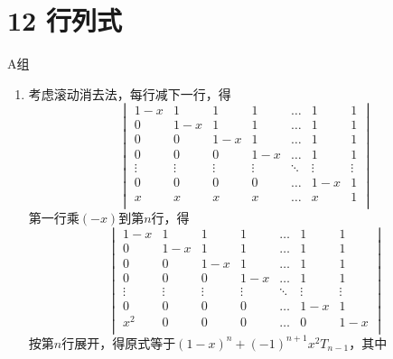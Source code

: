 \section*{12 行列式}

\vspace{2ex}

\centerline{\heiti A组}
\begin{enumerate}
    \item 考虑滚动消去法，每行减下一行，得
          \[ \begin{vmatrix}
                  1-x    & 1      & 1      & 1      & \ldots & 1      & 1      \\
                  0      & 1-x    & 1      & 1      & \ldots & 1      & 1      \\
                  0      & 0      & 1-x    & 1      & \ldots & 1      & 1      \\
                  0      & 0      & 0      & 1-x    & \ldots & 1      & 1      \\
                  \vdots & \vdots & \vdots & \vdots & \ddots & \vdots & \vdots \\
                  0      & 0      & 0      & 0      & \ldots & 1-x    & 1      \\
                  x      & x      & x      & x      & \ldots & x      & 1      \\
              \end{vmatrix} \]
          第一行乘$(-x)$到第$n$行，得
          \[\begin{vmatrix}
                  1-x    & 1      & 1      & 1      & \ldots & 1      & 1      \\
                  0      & 1-x    & 1      & 1      & \ldots & 1      & 1      \\
                  0      & 0      & 1-x    & 1      & \ldots & 1      & 1      \\
                  0      & 0      & 0      & 1-x    & \ldots & 1      & 1      \\
                  \vdots & \vdots & \vdots & \vdots & \ddots & \vdots & \vdots \\
                  0      & 0      & 0      & 0      & \ldots & 1-x    & 1      \\
                  x^2    & 0      & 0      & 0      & \ldots & 0      & 1-x    \\
              \end{vmatrix}\]
          按第$n$行展开，得原式等于$(1-x)^n+(-1)^{n+1}x^2T_{n-1}$，其中

\end{enumerate}
